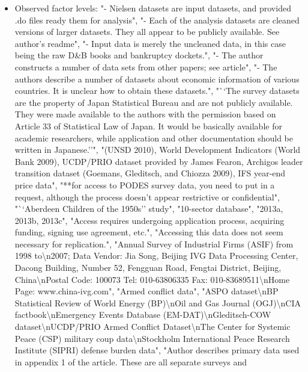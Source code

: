 \documentclass[]{article}
\providecommand{\tightlist}{%
  \setlength{\itemsep}{0pt}\setlength{\parskip}{0pt}}
\begin{document}
\begin{itemize}
\tightlist
\item
  Observed factor levels: "- Nielsen datasets are input datasets, and
  provided .do files ready them for analysis", "- Each of the analysis
  datasets are cleaned versions of larger datasets. They all appear to
  be publicly available. See author's readme", "- Input data is merely
  the uncleaned data, in this case being the raw D\&B books and
  bankruptcy dockets.", "- The author constructs a number of data sets
  from other papers; see article", "- The authors describe a number of
  datasets about economic information of various countries. It is
  unclear how to obtain these datasets.", "``The survey datasets are the
  property of Japan Statistical Bureau and are not publicly available.
  They were made available to the authors with the permission based on
  Article 33 of Statistical Law of Japan. It would be basically
  available for academic researchers, while application and other
  documentation should be written in Japanese.''", "(UNSD 2010), World
  Development Indicators (World Bank 2009), UCDP/PRIO dataset provided
  by James Fearon, Archigos leader transition dataset (Goemans,
  Gleditsch, and Chiozza 2009), IFS year-end price data", "**for access
  to PODES survey data, you need to put in a request, although the
  process doesn't appear restrictive or confidential", "``Aberdeen
  Children of the 1950s'' study", "10-sector database", "2013a, 2013b,
  2013c", "Access requires undergoing application process, acquiring
  funding, signing use agreement, etc.", "Accessing this data does not
  seem necessary for replication.", "Annual Survey of Industrial Firms
  (ASIF) from 1998 to\textbackslash{}n2007; Data Vendor: Jia Song,
  Beijing IVG Data Processing Center, Dacong Building, Number 52,
  Fengguan Road, Fengtai District, Beijing, China\textbackslash{}nPostal
  Code: 100073 Tel: 010-63806335 Fax: 010-83689511\textbackslash{}nHome
  Page: www.china-ivg.com", "Armed conflict data", "ASPO
  dataset\textbackslash{}nBP Statistical Review of World Energy
  (BP)\textbackslash{}nOil and Gas Journal (OGJ)\textbackslash{}nCIA
  factbook\textbackslash{}nEmergency Events Database
  (EM-DAT)\textbackslash{}nGleditsch-COW
  dataset\textbackslash{}nUCDP/PRIO Armed Conflict
  Dataset\textbackslash{}nThe Center for Systemic Peace (CSP) military
  coup data\textbackslash{}nStockholm International Peace Research
  Institute (SIPRI) defense burden data", "Author describes primary data
  used in appendix 1 of the article. These are all separate surveys and

\end{itemize}
\end{document}
